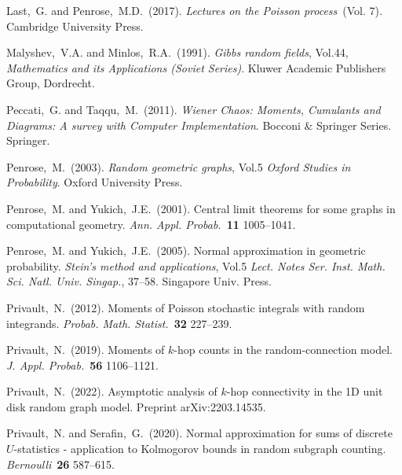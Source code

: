 \documentclass[bj,authoryear,noshowframe]{imsart}
\theoremstyle{plain}
\theoremstyle{remark}
\begin{document}
\begin{thebibliography}{4}
  Last,~G. and Penrose,~M.D.~(2017).
  \textit{Lectures on the Poisson process}~(Vol. 7).
  Cambridge University Press.

  Malyshev,~V.A. and Minlos,~R.A.~(1991).
  \textit{Gibbs random fields}, Vol.44, {\em Mathematics and its Applications (Soviet Series)}.
  \newblock Kluwer Academic Publishers Group, Dordrecht.

  Peccati,~G. and Taqqu,~M.~(2011).
  \textit{Wiener Chaos: Moments, Cumulants and Diagrams: A survey with Computer Implementation}.
  \newblock Bocconi \& Springer Series. Springer.

  Penrose,~M.~(2003).
  \textit{Random geometric graphs}, Vol.5 {\em Oxford Studies in Probability}.
  \newblock Oxford University Press.

  


  Penrose,~M. and Yukich,~J.E.~(2001).
  Central limit theorems for some graphs in computational geometry.
  \textit{Ann. Appl. Probab.}~\textbf{11} 1005--1041.

  Penrose,~M. and Yukich,~J.E.~(2005).
  Normal approximation in geometric probability.
  {\em Stein's method and applications}, Vol.5 {\em Lect.
    Notes Ser. Inst. Math. Sci. Natl. Univ. Singap.}, 37--58. Singapore Univ. Press.

  Privault,~N.~(2012).
  Moments of {P}oisson stochastic integrals with random integrands.
  \textit{Probab. Math. Statist.}~\textbf{32} 227--239.

  Privault,~N.~(2019).
  Moments of $k$-hop counts in the random-connection model.
  \textit{J. Appl. Probab.}~\textbf{56} 1106--1121.

  Privault,~N.~(2022).
  Asymptotic analysis of $k$-hop connectivity in the 1{D} unit disk random graph model.
  Preprint arXiv:2203.14535.

  Privault,~N. and Serafin,~G.~(2020).
  Normal approximation for sums of discrete $U$-statistics -
  application to {K}olmogorov bounds in random subgraph counting.
  \textit{Bernoulli}~\textbf{26} 587--615.


\end{thebibliography}
\end{document}
